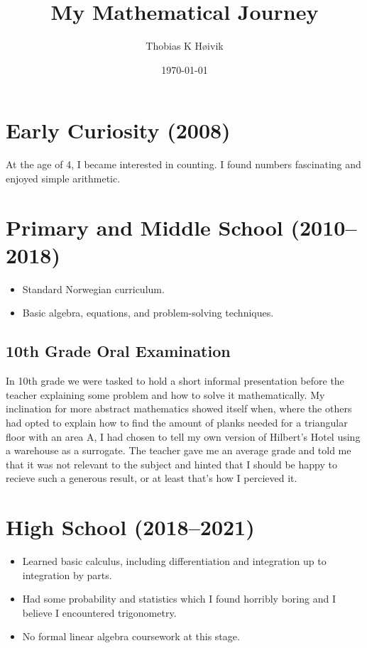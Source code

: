 \documentclass{article}
\title{My Mathematical Journey}
\author{Thobias K Høivik}
\date{\today}
\begin{document}
\maketitle

\section{Early Curiosity (2008)}
At the age of 4, I became interested in counting. I found numbers fascinating and enjoyed simple arithmetic.

\section{Primary and Middle School (2010--2018)}
\begin{itemize}
    \item Standard Norwegian curriculum.
    \item Basic algebra, equations, and problem-solving techniques.
\end{itemize}
\subsection*{10th Grade Oral Examination}
In 10th grade we were tasked to hold a short informal presentation before the teacher explaining some problem and how to solve it mathematically. 
My inclination for more abstract mathematics showed itself when, where the others had opted to explain how to find the amount of planks needed for a triangular floor with an area A, I had chosen to tell my own version of Hilbert's Hotel using a warehouse as a surrogate.
The teacher gave me an average grade and told me that it was not relevant to the subject and hinted that I should be happy to recieve such a generous result, or at least that's how I percieved it.

\break
\section{High School (2018--2021)}
\begin{itemize}
    \item Learned basic calculus, including differentiation and integration up to integration by parts.
    \item Had some probability and statistics which I found horribly boring and I believe I encountered trigonometry.
    \item No formal linear algebra coursework at this stage.
\end{itemize}
\end{document}

